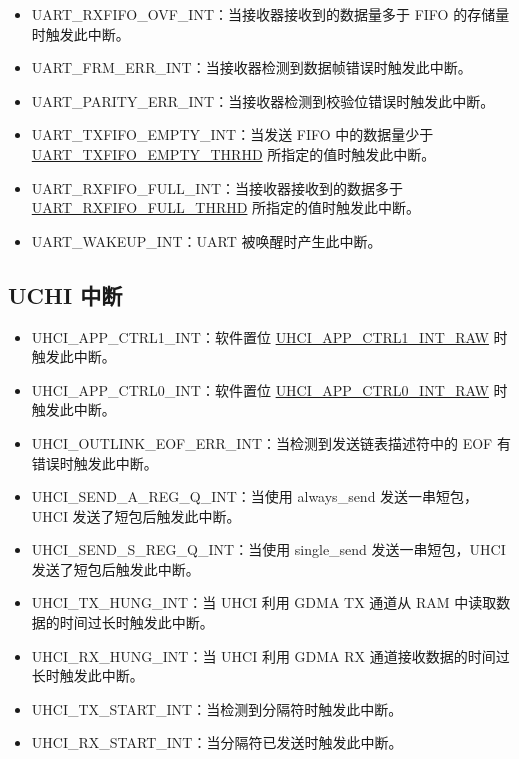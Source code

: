 \documentclass[main\_\_CN.tex]{subfiles}
\begin{document}
\begin{itemize}
\item \label{int:UARTRXFIFOOVFINT}UART\_RXFIFO\_OVF\_INT：当接收器接收到的数据量多于 FIFO 的存储量时触发此中断。
\item \label{int:UARTFRMERRINT}UART\_FRM\_ERR\_INT：当接收器检测到数据帧错误时触发此中断。
\item \label{int:UARTPARITYERRINT}UART\_PARITY\_ERR\_INT：当接收器检测到校验位错误时触发此中断。
\item \label{int:UARTTXFIFOEMPTYINT}UART\_TXFIFO\_EMPTY\_INT：当发送 FIFO 中的数据量少于 \hyperref[fielddesc:UARTTXFIFOEMPTYTHRHD]{UART\_TXFIFO\_EMPTY\_THRHD} 所指定的值时触发此中断。
\item \label{int:UARTRXFIFOFULLINT}UART\_RXFIFO\_FULL\_INT：当接收器接收到的数据多于 \hyperref[fielddesc:UARTRXFIFOFULLTHRHD]{UART\_RXFIFO\_FULL\_THRHD} 所指定的值时触发此中断。
\item \label{int:UARTWAKEUPINT}UART\_WAKEUP\_INT：UART 被唤醒时产生此中断。
\end{itemize}

\subsection{UCHI 中断}
\begin{itemize}
\item \label{int:UHCIAPPCTRL1INT}UHCI\_APP\_CTRL1\_INT：软件置位 \hyperref[fielddesc:UHCIAPPCTRL1INTRAW]{UHCI\_APP\_CTRL1\_INT\_RAW} 时触发此中断。
\item \label{int:UHCIAPPCTRL0INT}UHCI\_APP\_CTRL0\_INT：软件置位 \hyperref[fielddesc:UHCIAPPCTRL0INTRAW]{UHCI\_APP\_CTRL0\_INT\_RAW} 时触发此中断。
\item \label{int:UHCIOUTLINKEOFERRINT}UHCI\_OUTLINK\_EOF\_ERR\_INT：当检测到发送链表描述符中的 EOF 有错误时触发此中断。
\item \label{int:UHCISENDAREGQINT}UHCI\_SEND\_A\_REG\_Q\_INT：当使用 always\_send 发送一串短包，UHCI 发送了短包后触发此中断。
\item \label{int:UHCISENDSREGQINT}UHCI\_SEND\_S\_REG\_Q\_INT：当使用 single\_send 发送一串短包，UHCI 发送了短包后触发此中断。
\item \label{int:UHCITXHUNGINT}UHCI\_TX\_HUNG\_INT：当 UHCI 利用 GDMA TX 通道从 RAM 中读取数据的时间过长时触发此中断。
\item \label{int:UHCIRXHUNGINT}UHCI\_RX\_HUNG\_INT：当 UHCI 利用 GDMA RX 通道接收数据的时间过长时触发此中断。
\item \label{int:UHCITXSTARTINT}UHCI\_TX\_START\_INT：当检测到分隔符时触发此中断。
\item \label{int:UHCIRXSTARTINT}UHCI\_RX\_START\_INT：当分隔符已发送时触发此中断。
\end{itemize}
\end{document}
